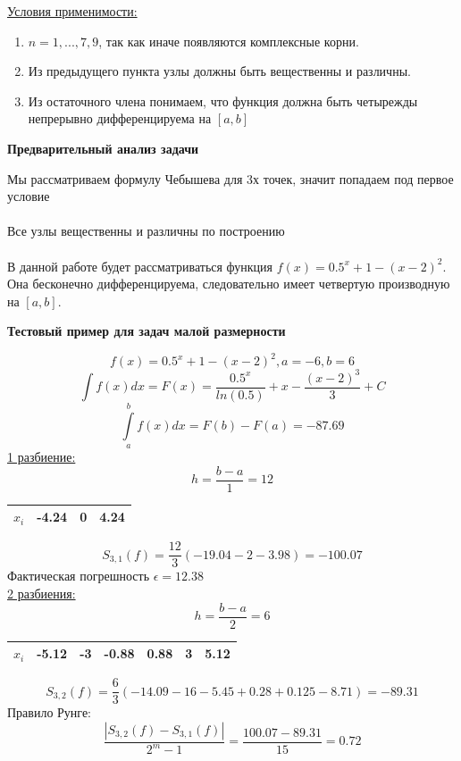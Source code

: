 \documentclass{article}
\begin{document}
	\underline{Условия применимости:}
	\begin{enumerate}
		\item $n = 1, ..., 7, 9$, так как иначе появляются комплексные корни.
		\item Из предыдущего пункта узлы должны быть вещественны и различны.
		\item Из остаточного члена понимаем, что функция должна быть четырежды непрерывно дифференцируема на $[a,b]$
	\end{enumerate}
	\begin{center} \textbf{Предварительный анализ задачи}\end{center}
	Мы рассматриваем формулу Чебышева для 3х точек, значит попадаем под первое условие\\
	\\
	Все узлы вещественны и различны по построению\\
	\\
	В данной работе будет рассматриваться функция $f(x) = 0.5^x + 1 - (x-2)^2$. Она бесконечно дифференцируема, следовательно имеет четвертую производную на $[a,b]$.
	\begin{center} \textbf{Тестовый пример для задач малой размерности}\end{center}
	$$f(x) = 0.5^x + 1 - (x-2)^2, a = -6, b = 6$$
	$$\int f(x)dx = F(x) = \frac{0.5^x}{ln(0.5)} + x - \frac{(x-2)^3}{3} + C$$
	$$\int\limits_a^bf(x)dx = F(b) - F(a) = -87.69$$
	\underline{1 разбиение:}\\
	$$h = \frac{b-a}{1} = 12$$
	\begin{center}
		\begin{tabular}{|c|c|c|c|}
			\hline
			$x_i$ & -4.24 & 0 & 4.24 \\ 
			\hline
		\end{tabular}
	\end{center}
	$$S_{3, 1}(f) = \frac{12}{3}(-19.04 - 2 - 3.98) = -100.07$$
	Фактическая погрешность $\epsilon = 12.38$\\
	\underline{2 разбиения:}\\
	$$h = \frac{b-a}{2} = 6$$
	\begin{center}
		\begin{tabular}{|c|c|c|c|c|c|c|}
			\hline
			$x_i$ & -5.12 & -3 & -0.88 & 0.88 & 3 & 5.12\\ 
			\hline
		\end{tabular}
	\end{center}
	$$S_{3, 2}(f) = \frac{6}{3}(-14.09 - 16 - 5.45 + 0.28 + 0.125 - 8.71) = -89.31$$
	Правило Рунге:
	$$\frac{|S_{3, 2}(f) - S_{3, 1}(f)|}{2^m - 1} = \frac{100.07-89.31}{15} = 0.72$$
\end{document}
